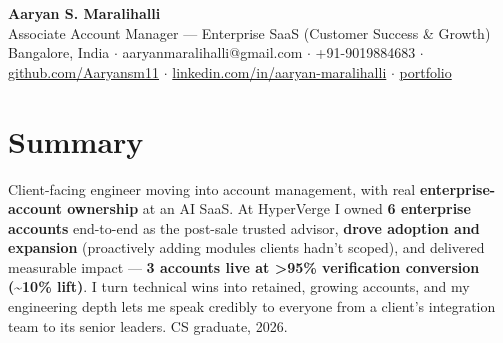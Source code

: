 \documentclass[10pt,a4paper]{article}
\begin{document}
\vspace*{-1cm}
\begin{center}
{\LARGE\bfseries Aaryan S. Maralihalli}\\[0.5em]
{\large Associate Account Manager --- Enterprise SaaS (Customer Success \& Growth)}\\[0.3em]
Bangalore, India $\cdot$ aaryanmaralihalli@gmail.com $\cdot$ +91-9019884683 $\cdot$ \href{https://github.com/Aaryansm11}{github.com/Aaryansm11} $\cdot$ \href{https://linkedin.com/in/aaryan-maralihalli}{linkedin.com/in/aaryan-maralihalli} $\cdot$ \href{https://portfolio-zeta-ten-85.vercel.app}{portfolio}
\end{center}\vspace{0.4ex}
\section*{Summary}
Client-facing engineer moving into account management, with real \textbf{enterprise-account ownership} at an AI SaaS. At HyperVerge I owned \textbf{6 enterprise accounts} end-to-end as the post-sale trusted advisor, \textbf{drove adoption and expansion} (proactively adding modules clients hadn't scoped), and delivered measurable impact --- \textbf{3 accounts live at \textgreater{}95\% verification conversion (\textasciitilde{}10\% lift)}. I turn technical wins into retained, growing accounts, and my engineering depth lets me speak credibly to everyone from a client's integration team to its senior leaders. CS graduate, 2026.\par\vspace{2pt}
\end{document}
